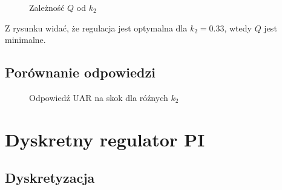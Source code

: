 \documentclass{article}
\begin{document}
\begin{figure}[h]
\centering
{}
\caption{Zależność \( Q \) od \(k_2\)}
\end{figure}

\pagebreak
Z rysunku widać, że regulacja jest optymalna dla \( k_2 = 0.33 \), wtedy \(Q\) jest minimalne.

\subsection{Porównanie odpowiedzi}

\begin{figure}[ht]
\centering
{}
\caption{Odpowiedź UAR na skok dla róźnych \(k_2\)}
\end{figure}


\section{Dyskretny regulator PI}

\subsection{Dyskretyzacja}
\end{document}
